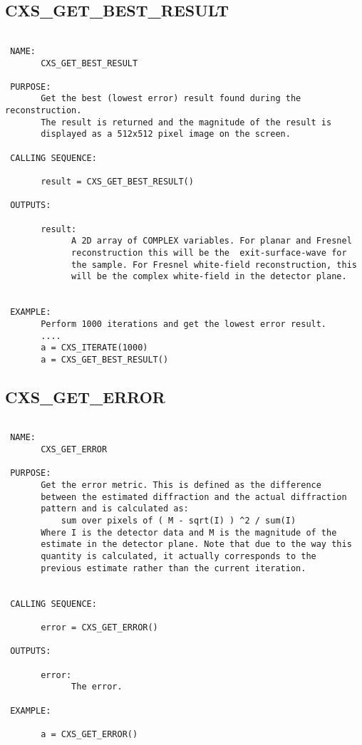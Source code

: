\subsection{CXS\_GET\_BEST\_RESULT}
\begin{verbatim}

 NAME:
       CXS_GET_BEST_RESULT

 PURPOSE:
       Get the best (lowest error) result found during the reconstruction.
       The result is returned and the magnitude of the result is
       displayed as a 512x512 pixel image on the screen.

 CALLING SEQUENCE:

       result = CXS_GET_BEST_RESULT()

 OUTPUTS:

       result:
             A 2D array of COMPLEX variables. For planar and Fresnel
             reconstruction this will be the  exit-surface-wave for
             the sample. For Fresnel white-field reconstruction, this
             will be the complex white-field in the detector plane.


 EXAMPLE:
       Perform 1000 iterations and get the lowest error result.
       ....
       a = CXS_ITERATE(1000)
       a = CXS_GET_BEST_RESULT()

\end{verbatim}

\subsection{CXS\_GET\_ERROR}
\begin{verbatim}

 NAME:
       CXS_GET_ERROR

 PURPOSE:
       Get the error metric. This is defined as the difference
       between the estimated diffraction and the actual diffraction
       pattern and is calculated as:
           sum over pixels of ( M - sqrt(I) ) ^2 / sum(I) 
       Where I is the detector data and M is the magnitude of the
       estimate in the detector plane. Note that due to the way this
       quantity is calculated, it actually corresponds to the
       previous estimate rather than the current iteration.


 CALLING SEQUENCE:

       error = CXS_GET_ERROR()

 OUTPUTS:

       error:
             The error. 

 EXAMPLE:

       a = CXS_GET_ERROR()

\end{verbatim}

